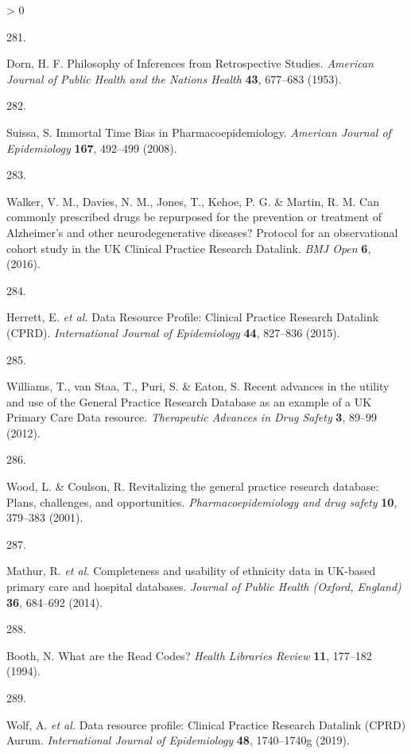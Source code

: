 \documentclass[a4paper, twoside]{templates/ociamthesis}
\newlength{\cslhangindent}
\newlength{\csllabelwidth}
\newenvironment{CSLReferences}[3] %
 {%
  \setlength{\parindent}{0pt}
  \ifodd #1 \everypar{\setlength{\hangindent}{\cslhangindent}}\ignorespaces\fi
  \ifnum #2 > 0
  \setlength{\parskip}{#2\baselineskip}
  \fi
 }%
 {}
\newcommand{\CSLLeftMargin}[1]{\parbox[t]{\maxof{\widthof{#1}}{\csllabelwidth}}{#1}}
\newcommand{\CSLRightInline}[1]{\parbox[t]{\linewidth - \csllabelwidth}{#1}}
\begin{document}
\begin{CSLReferences}{0}{0}
\leavevmode\hypertarget{ref-dorn1953}{}%
\CSLLeftMargin{281. }
\CSLRightInline{Dorn, H. F. Philosophy of {Inferences} from {Retrospective Studies}. \emph{American Journal of Public Health and the Nations Health} \textbf{43}, 677--683 (1953).}

\leavevmode\hypertarget{ref-suissa2008}{}%
\CSLLeftMargin{282. }
\CSLRightInline{Suissa, S. Immortal {Time Bias} in {Pharmacoepidemiology}. \emph{American Journal of Epidemiology} \textbf{167}, 492--499 (2008).}

\leavevmode\hypertarget{ref-walker2016}{}%
\CSLLeftMargin{283. }
\CSLRightInline{Walker, V. M., Davies, N. M., Jones, T., Kehoe, P. G. \& Martin, R. M. Can commonly prescribed drugs be repurposed for the prevention or treatment of {Alzheimer}'s and other neurodegenerative diseases? Protocol for an observational cohort study in the {UK Clinical Practice Research Datalink}. \emph{BMJ Open} \textbf{6}, (2016).}

\leavevmode\hypertarget{ref-herrett2015}{}%
\CSLLeftMargin{284. }
\CSLRightInline{Herrett, E. \emph{et al.} Data {Resource Profile}: Clinical {Practice Research Datalink} ({CPRD}). \emph{International Journal of Epidemiology} \textbf{44}, 827--836 (2015).}

\leavevmode\hypertarget{ref-williams2012}{}%
\CSLLeftMargin{285. }
\CSLRightInline{Williams, T., van Staa, T., Puri, S. \& Eaton, S. Recent advances in the utility and use of the {General Practice Research Database} as an example of a {UK Primary Care Data} resource. \emph{Therapeutic Advances in Drug Safety} \textbf{3}, 89--99 (2012).}

\leavevmode\hypertarget{ref-wood2001revitalizing}{}%
\CSLLeftMargin{286. }
\CSLRightInline{Wood, L. \& Coulson, R. Revitalizing the general practice research database: Plans, challenges, and opportunities. \emph{Pharmacoepidemiology and drug safety} \textbf{10}, 379--383 (2001).}

\leavevmode\hypertarget{ref-mathur2014}{}%
\CSLLeftMargin{287. }
\CSLRightInline{Mathur, R. \emph{et al.} Completeness and usability of ethnicity data in {UK}-based primary care and hospital databases. \emph{Journal of Public Health (Oxford, England)} \textbf{36}, 684--692 (2014).}

\leavevmode\hypertarget{ref-booth1994}{}%
\CSLLeftMargin{288. }
\CSLRightInline{Booth, N. What are the {Read Codes}? \emph{Health Libraries Review} \textbf{11}, 177--182 (1994).}

\leavevmode\hypertarget{ref-wolf2019}{}%
\CSLLeftMargin{289. }
\CSLRightInline{Wolf, A. \emph{et al.} Data resource profile: Clinical {Practice Research Datalink} ({CPRD}) {Aurum}. \emph{International Journal of Epidemiology} \textbf{48}, 1740--1740g (2019).}


\end{CSLReferences}
\end{document}
